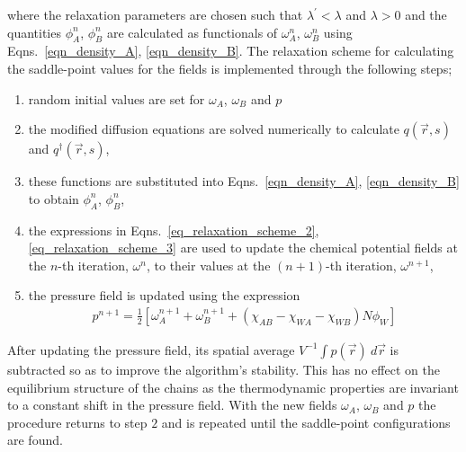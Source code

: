 \documentclass[onecolumn,amsmath,amssymb,floatfix]{elsart}
\begin{document}
%
where the relaxation parameters are chosen such that
$\lambda^{'} < \lambda$ and $\lambda > 0$
and the quantities $\phi_A^n$, $\phi_B^n$
are calculated as functionals of $\omega_A^n$, $\omega_B^n$
using Eqns.~\ref{eqn_density_A}, \ref{eqn_density_B}.
The relaxation scheme for calculating the saddle-point values for the fields
is implemented through the following steps;
%
 \begin{enumerate}
  \item  random initial values are set for $\omega_A$, $\omega_B$ and $p$
  \item  the modified diffusion equations are solved
         numerically to calculate $q({\vec r},s)$ and $q^\dagger({\vec r},s)$,
  \item  these functions are substituted into Eqns.~\ref{eqn_density_A},
         \ref{eqn_density_B} to obtain $\phi_A^n$, $\phi_B^n$,
  \item  the expressions in Eqns.~\ref{eq_relaxation_scheme_2}, \ref{eq_relaxation_scheme_3}
         are used to update the
         chemical potential fields at the $n$-th iteration, $\omega^{n}$,
         to their values at the $(n+1)$-th iteration, $\omega^{n+1}$,
  \item  the pressure field is updated using the expression
         \begin{eqnarray}
           p^{n+1} = \frac{1}{2} 
                      \left [ \omega^{n+1}_A + \omega^{n+1}_B +
                      (\chi_{AB}-\chi_{WA}-\chi_{WB}) N \phi_W \right ]
	 \end{eqnarray}
 \end{enumerate}
After updating the pressure field, its spatial average
$V^{-1} \int p({\vec r}) \ d{\vec r}$ is subtracted so as
to improve the algorithm's stability.
This has no effect on the equilibrium structure of the chains as the thermodynamic
properties are invariant to a constant shift in the pressure field.
With the new fields $\omega_A$, $\omega_B$ and $p$ the procedure returns
to step $2$ and is repeated until the saddle-point configurations are found.







\end{document}

